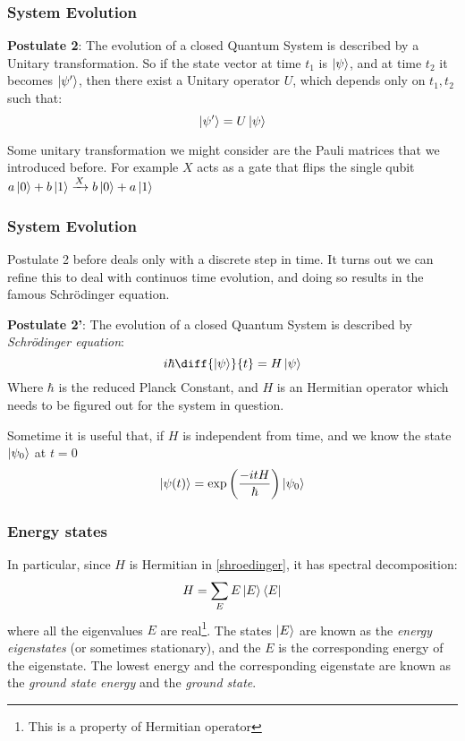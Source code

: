 \documentclass{beamer}
\begin{document}
    \begin{frame}
        \frametitle{System Evolution}
        \begin{definition}
            \textbf{Postulate 2}: The evolution of a closed Quantum System is described by a
            Unitary transformation. So if the state vector at time $t_1$ is $\ket{\psi}$, 
            and at time $t_2$ it becomes $\ket{\psi'}$, then there exist a Unitary operator $U$, 
            which depends only on $t_1, t_2$ such that:
            \begin{equation}
                \ket{\psi'} = U \ket{\psi}
            \end{equation}

        \end{definition}
        Some unitary transformation we might consider are the Pauli matrices that we introduced before.
        For example $X$ acts as a gate that flips the single qubit $a\ket{0} + b\ket{1} \xrightarrow{X} b\ket{0} + a\ket{1}$
    \end{frame}
    \begin{frame}
        \frametitle{System Evolution}
        Postulate 2 before deals only with a discrete step in time. It turns out we can refine this to deal
        with continuos time evolution, and doing so results in the famous Schrödinger equation.
        \begin{definition}
            \textbf{Postulate 2'}:  The evolution of a closed Quantum System is described by \textit{Schrödinger equation}:
            \begin{equation}
                \label{shroedinger}
                i \hbar \diff{\ket{\psi}}{t} = H \ket{\psi}
            \end{equation}
            Where $\hbar$ is the reduced Planck Constant, and $H$ is an Hermitian operator which needs to 
            be figured out for the system in question.
        \end{definition}
        Sometime it is useful that, if $H$ is independent from time, and we know the state $\ket{\psi_0}$ at $t = 0$
        \begin{equation}
            \ket{\psi(t)} = \exp\left(\frac{-itH}{\hbar}\right)\ket{\psi_0}
        \end{equation}
    \end{frame}
    \begin{frame}
        \frametitle{Energy states}
        In particular, since $H$ is Hermitian in \ref{shroedinger}, it has spectral decomposition:
        \begin{equation}
            H = \sum_E E \ket{E}\bra{E}
        \end{equation}
        where all the eigenvalues $E$ are real\footnote{This is a property of Hermitian operator}. 
        The states $\ket{E}$ are known as the \textit{energy eigenstates} (or sometimes stationary), and the $E$ is the corresponding
        energy of the eigenstate. The lowest energy and the corresponding eigenstate are known as the \textit{ground state energy} and the \textit{ground state}.
    \end{frame}
\end{document}
